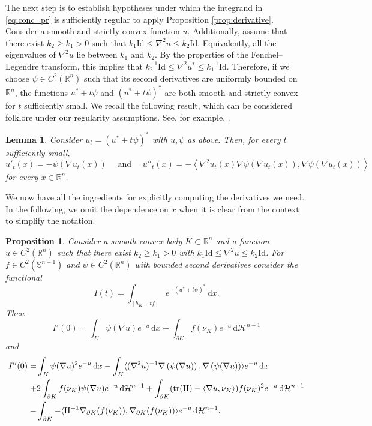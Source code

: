\documentclass[a4paper, 11pt]{article}
\newcommand{\R}{\mathbb{R}}
\newcommand{\sph}{\mathbb{S}}
\newcommand{\haus}{\mathcal{H}}
\newcommand{\tra}{\mathrm{tr}}
\newcommand{\Id}{\mathrm{Id}}
\newtheorem{proposition}[theorem]{Proposition}
\newtheorem{lemma}[theorem]{Lemma}
\theoremstyle{definition}
\newcommand{\di}{\, \mathrm{d}}
\begin{document}
The next step is to establish hypotheses under which the integrand in \eqref{eq:conc_pr} is sufficiently regular to apply Proposition \ref{prop:derivative}. Consider a smooth and strictly convex function $u$. Additionally, assume that there exist $k_2 \geq k_1 >0$ such that $k_1 \Id \leq \nabla^2 u \leq k_2 \Id$. Equivalently, all the eigenvalues of $\nabla^2 u$ lie between $k_1$ and $k_2$. By the properties of the Fenchel--Legendre transform, this implies that $k_2^{-1} \Id \leq \nabla^2 u^* \leq k_1^{-1} \Id$. Therefore, if we choose $\psi \in C^2(\R^n)$ such that its second derivatives are uniformly bounded on $\R^n$, the functions $u^*+t\psi$ and $(u^*+t\psi)^*$ are both smooth and strictly convex for $t$ sufficiently small. We recall the following result, which can be considered folklore under our regularity assumptions. See, for example, \cite[Propositions 5.1 and 5.3]{Artstein_diff_pol}.
\begin{lemma}\label{lemma:first_second}
    Consider $u_t=(u^*+t\psi)^*$ with $u,\psi$ as above. Then, for every $t$ sufficiently small, \[ u'_t(x) =-\psi(\nabla u_t(x)) \quad \text{ and } \quad  u''_t(x)= - \left\langle \nabla^2 u_t(x)   \nabla \psi (\nabla u_t(x)) , \nabla \psi (\nabla u_t(x)) \right \rangle\] for every $x \in \R^n$.  
\end{lemma}\noindent
We now have all the ingredients for explicitly computing the derivatives we need. In the following, we omit the dependence on $x$ when it is clear from the context to simplify the notation. 
\begin{proposition}\label{prop:explicit_derivatives}
    Consider a smooth convex body $K \subset \R^n$ and a function $u\in C^2(\R^n)$ such that there exist $k_2 \geq k_1 >0$ with $k_1 \Id \leq \nabla^2 u \leq k_2 \Id$. For $f \in C^2(\sph^{n-1})$ and $\psi \in C^2(\R^n)$ with bounded second derivatives consider the functional \[ I(t)=\int_{[h_K+tf]} e^{-(u^*+t\psi)^*}\di x.\] Then
    \begin{equation}\label{eq:first_explicit}
        I'(0)=\int_{K} \psi(\nabla u)e^{-u}\di x + \int_{\partial K} f(\nu_K)e^{-u}\di \haus^{n-1}
    \end{equation}
    and
    \begin{align}\label{eq:second_explicit}
        I''(0)  = & \int_K \psi(\nabla u)^2 e^{-u} \di x -\int_K \langle(\nabla^2 u)^{-1}\nabla \left(\psi(\nabla u)\right),\nabla \left(\psi(\nabla u)\right) \rangle e^{-u}\di x  \notag  \\  + & 2\int_{\partial K} f(\nu_K)\psi(\nabla u)e^{-u}\di \haus^{n-1}+ 
        \int_{\partial K}(\tra({\rm II})-\langle \nabla u, \nu_K \rangle)f(\nu_K)^2 e^{-u}\di \haus^{n-1}\\ - & \int_{\partial K} -\langle {\rm II}^{-1}\nabla_{\partial K} (f(\nu_K)),\nabla_{\partial K} (f(\nu_K))\rangle e^{-u}\di \haus^{n-1}. \notag
    \end{align}
\end{proposition}
\end{document}
